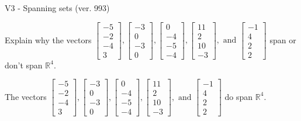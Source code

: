 \begin{exercise}
  \begin{exerciseTitle}V3 - Spanning sets (ver. 993)\end{exerciseTitle}
  \begin{exerciseStatement}
    Explain why the vectors \(\left[\begin{array}{r}
-5 \\
-2 \\
-4 \\
3
\end{array}\right] , \left[\begin{array}{r}
-3 \\
0 \\
-3 \\
0
\end{array}\right] , \left[\begin{array}{r}
0 \\
-4 \\
-5 \\
-4
\end{array}\right] , \left[\begin{array}{r}
11 \\
2 \\
10 \\
-3
\end{array}\right] , \text{ and } \left[\begin{array}{r}
-1 \\
4 \\
2 \\
2
\end{array}\right]\) span or don't span \(\mathbb{R}^4\). 
	


  \end{exerciseStatement}
  \begin{exerciseAnswer}
   The vectors \(\left[\begin{array}{r}
-5 \\
-2 \\
-4 \\
3
\end{array}\right] , \left[\begin{array}{r}
-3 \\
0 \\
-3 \\
0
\end{array}\right] , \left[\begin{array}{r}
0 \\
-4 \\
-5 \\
-4
\end{array}\right] , \left[\begin{array}{r}
11 \\
2 \\
10 \\
-3
\end{array}\right] , \text{ and } \left[\begin{array}{r}
-1 \\
4 \\
2 \\
2
\end{array}\right]\) 
  	 do  
	span \(\mathbb{R}^4\).
  



\end{exerciseAnswer}
\end{exercise}
